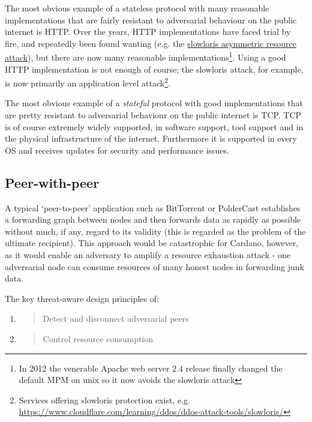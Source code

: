 \documentclass[11pt,a4paper]{article}
\begin{document}
The most obvious example of a stateless protocol with many reasonable
implementations that are fairly resistant to adversarial behaviour on
the public internet is HTTP. Over the years, HTTP implementations have
faced trial by fire, and repeatedly been found wanting (e.g. the
\href{https://en.wikipedia.org/wiki/Slowloris_(computer_security)}{{slowloris
asymmetric resource attack}}), but there are now many reasonable
implementations\footnote{In 2012 the venerable Apache web server 2.4
  release finally changed the default MPM on unix so it now avoids the
  slowloris attack}. Using a good HTTP implementation is not enough of
course; the slowloris attack, for example, is now primarily an
application level attack\footnote{Services offering slowloris protection
  exist, e.g.
  \href{https://www.cloudflare.com/learning/ddos/ddos-attack-tools/slowloris/}{{https://www.cloudflare.com/learning/ddos/ddos-attack-tools/slowloris/}}}.

The most obvious example of a \emph{stateful} protocol with good
implementations that are pretty resistant to adversarial behaviour on
the public internet is TCP. TCP is of course extremely widely supported,
in software support, tool support and in the physical infrastructure of
the internet. Furthermore it is supported in every OS and receives
updates for security and performance issues.

\subsection{Peer-with-peer}
\label{peer-with-peer}

A typical `peer-to-peer' application such as BitTorrent or PolderCast
establishes a forwarding graph between nodes and then forwards data as
rapidly as possible without much, if any, regard to its validity (this
is regarded as the problem of the ultimate recipient). This approach
would be catastrophic for Cardano, however, as it would enable an
adversary to amplify a resource exhaustion attack - one adversarial node
can consume resources of many honest nodes in forwarding junk data.

The key threat-aware design principles of:

\begin{enumerate}
\def\labelenumi{\arabic{enumi}.}
\item
  \begin{quote}
  Detect and disconnect adversarial peers
  \end{quote}
\item
  \begin{quote}
  Control resource consumption
  \end{quote}
\end{enumerate}
\end{document}
